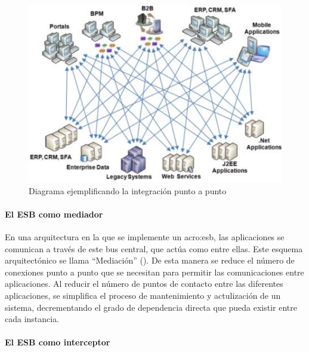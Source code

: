 \begin{figure}[H]
  \includegraphics[width=\linewidth]{src/images/03-capitulo-3/tecnologias/esb/point-to-point-integration.png}
  \caption{Diagrama ejemplificando la integración punto a punto}
  \label{fig:point-to-point-integration}
\end{figure}


\paragraph{El ESB como mediador}


En una arquitectura en la que se implemente un \gls{acro:esb}, las aplicaciones se comunican a través de este bus central, que actúa como  entre ellas. Este esquema arquitectónico se llama ``Mediación'' (). De esta manera se reduce el número de conexiones punto a punto que se necesitan para permitir las comunicaciones entre aplicaciones. Al reducir el número de puntos de contacto entre las diferentes aplicaciones, se simplifica el proceso de mantenimiento y actulización de un sistema, decrementando el grado de dependencia directa que pueda existir entre cada instancia.


\paragraph{El ESB como interceptor}


